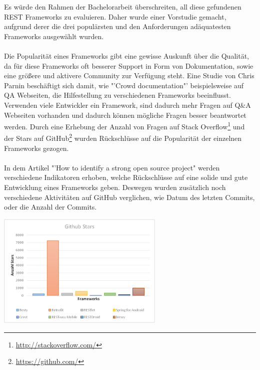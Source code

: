 Es würde den Rahmen der Bachelorarbeit überschreiten, all diese gefundenen REST Frameworks zu evaluieren. Daher wurde einer Vorstudie gemacht, aufgrund derer die drei populärsten und den Anforderungen adäquatesten Frameworks ausgewählt wurden.
\\\\
Die Popularität eines Frameworks gibt eine gewisse Auskunft über die Qualität, da für diese Frameworks oft besserer Support in Form von Dokumentation, sowie eine größere und aktivere Community zur Verfügung steht. Eine Studie von Chris Parnin\cite{parnin2012crowd} beschäftigt sich damit, wie "'Crowd documentation"' beispielsweise auf \acrfull{QA} Webseiten, die Hilfestellung zu verschiedenen Frameworks beeinflusst. Verwenden viele Entwickler ein Framework, sind dadurch mehr Fragen auf Q\&A Webseiten vorhanden und dadurch können mögliche Fragen besser beantwortet werden. Durch eine Erhebung der Anzahl von Fragen auf Stack Overflow\footnote{\href{http://stackoverflow.com/}{http://stackoverflow.com/}} und der Stars auf GitHub\footnote{\href{https://github.com/}{https://github.com/}} wurden Rückschlüsse auf die Popularität der einzelnen Frameworks gezogen.  
\\\\
In dem Artikel "'How to identify a strong open source project"\cite{balter:strongOS} werden verschiedene Indikatoren erhoben, welche Rückschlüsse auf eine solide und gute Entwicklung eines Frameworks geben. Deswegen wurden zusätzlich noch verschiedene Aktivitäten auf GitHub verglichen, wie Datum des letzten Commits, oder die Anzahl der Commits.

\begin{minipage}{\textwidth} 
	\centering	
	\includegraphics[width=0.60\textwidth]{figures/github_stars.png}
	\label{figure:githubStars}
	\vspace{2ex}
\end{minipage}

